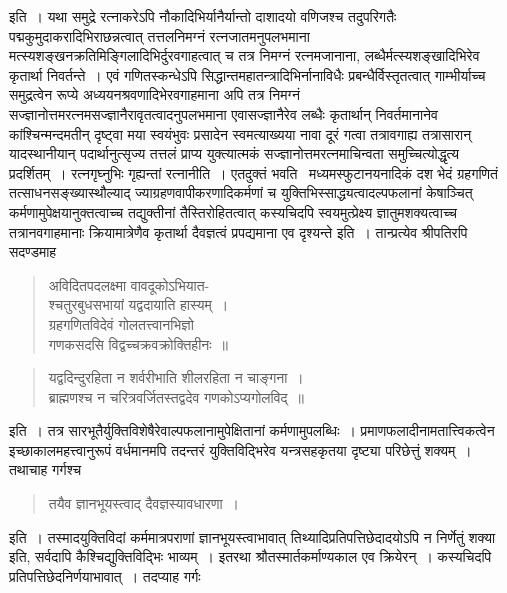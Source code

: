 \documentclass[11pt, openany]{book}
\begin{document}
\indent इति~। यथा समुद्रे रत्नाकरेऽपि नौकादिभिर्यानैर्यान्तो दाशादयो वणिजश्च तदुपरिगतैः पद्मकुमुदाकरादिभिराछन्नत्वात् तत्तलनिमग्नं रत्नजातमनुपलभमाना मत्स्यशङ्खनक्रतिमिङ्गिलादिभिर्दुरवगाहत्वात् च तत्र निमग्नं रत्नमजानाना, लब्धैर्मत्स्यशङ्खादिभिरेव कृतार्था निवर्तन्ते~।
एवं गणितस्कन्धेऽपि सिद्धान्तमहातन्त्रादिभिर्नानाविधैः प्रबन्धैर्विस्तृतत्वात् गाम्भीर्याच्च समुद्रत्वेन रूप्ये अध्ययनश्रवणादिभेरवगाहमाना अपि तत्र
निमग्नं सज्ज्ञानोत्तमरत्नमसज्ज्ञानैरावृतत्वादनुपलभमाना एवासज्ज्ञानैरेव लब्धैः कृतार्थान् निवर्तमानानेव कांश्चिन्मन्दमतीन् दृष्ट्वा मया
स्वयंभुवः प्रसादेन स्वमत्याख्यया नावा दूरं गत्वा तत्रावगाह्य तत्रासारान् यादस्थानीयान् पदार्थानुत्सृज्य तत्तलं प्राप्य युक्त्यात्मकं
सज्ज्ञानोत्तमरत्नमाचिन्वता समुच्चित्योद्धृत्य प्रदर्शितम्~। रत्नगृघ्नुभिः गृह्यन्तां रत्नानीति~। एतदुक्तं भवति \textendash\ मध्यमस्फुटानयनादिकं दश भेदं ग्रहगणितं तत्साधनसङ्ख्यास्थौल्याद् ज्याग्रहणवापीकरणादिकर्मणां च युक्तिभिस्साद्ध्यत्वादल्पफलानां केषाञ्चित् कर्मणामुपेक्षयानुक्तत्वाच्च तद्युक्तीनां तैस्तिरोहितत्वात् कस्यचिदपि स्वयमुत्प्रेक्ष्य ज्ञातुमशक्यत्वाच्च तत्रानवगाहमानाः क्रियामात्रेणैव कृतार्था दैवज्ञत्वं प्रपद्यमाना एव दृश्यन्ते इति~। तान्प्रत्येव श्रीपतिरपि सदण्डमाह\textendash  
\begin{quote}
{\qt अविदितपदलक्ष्मा वावदूकोऽभियात-\\
श्चतुरबुधसभायां यद्वदायाति हास्यम्~।\\
ग्रहगणितविदेवं गोलतत्त्वानभिज्ञो\\
गणकसदसि विद्वच्चक्रवक्रोक्तिहीनः~॥}
\end{quote}

\newpage

\begin{quote}
{\qt यद्वदिन्दुरहिता न शर्वरीभाति शीलरहिता न चाङ्गना~।\\
	ब्राह्मणश्च न चरित्रवर्जितस्तद्वदेव गणकोऽप्यगोलविद्~॥}
\end{quote}

\noindent इति~। तत्र सारभूतैर्युक्तिविशेषैरेवाल्पफलानामुपेक्षितानां कर्मणामुपलब्धिः~। प्रमाणफलादीनामतात्त्विकत्वेन इच्छाकालमहत्त्वानुरूपं
वर्धमानमपि तदन्तरं युक्तिविद्भिरेव यन्त्रसहकृतया दृष्ट्या परिछेत्तुं शक्यम्~। तथाचाह गर्गश्च\textendash 

\begin{quote}
{\qt तयैव ज्ञानभूयस्त्वाद् दैवज्ञस्यावधारणा~।}
\end{quote}

\noindent इति~। तस्मादयुक्तिविदां कर्ममात्रपराणां ज्ञानभूयस्त्वाभावात् तिथ्यादिप्रतिपत्तिछेदादयोऽपि न निर्णेतुं शक्या इति, सर्वदापि
कैश्चिद्युक्तिविद्भिः भाव्यम्~। इतरथा श्रौतस्मार्तकर्माण्यकाल एव क्रियेरन्~। कस्यचिदपि प्रतिपत्तिछेदनिर्णयाभावात्~। तदप्याह गर्गः\textendash 
\end{document}
